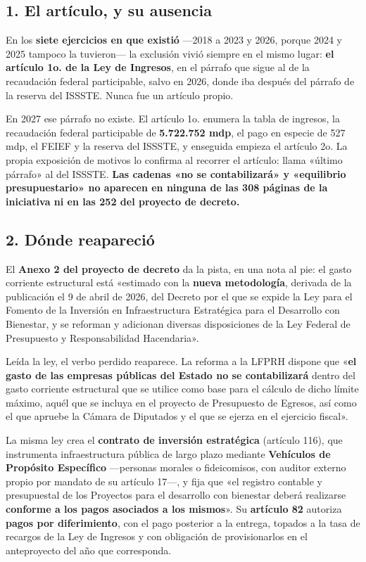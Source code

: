 \subsection*{1. El artículo, y su ausencia}

En los \textbf{siete ejercicios en que existió} ---2018 a 2023 y 2026, porque 2024 y 2025
tampoco la tuvieron--- la exclusión vivió siempre en el mismo lugar: \textbf{el artículo
1o. de la Ley de Ingresos}, en el párrafo que sigue al de la recaudación federal
participable, salvo en 2026, donde iba después del párrafo de la reserva del ISSSTE.
Nunca fue un artículo propio.

En 2027 ese párrafo no existe. El artículo 1o. enumera la tabla de ingresos, la recaudación
federal participable de \textbf{5.722.752 mdp}, el pago en especie de 527 mdp, el FEIEF y la
reserva del ISSSTE, y enseguida empieza el artículo 2o. La propia exposición de motivos lo
confirma al recorrer el artículo: llama «último párrafo» al del ISSSTE. \textbf{Las cadenas
«no se contabilizará» y «equilibrio presupuestario» no aparecen en ninguna de las 308
páginas de la iniciativa ni en las 252 del proyecto de decreto.}

\subsection*{2. Dónde reapareció}

El \textbf{Anexo 2 del proyecto de decreto} da la pista, en una nota al pie: el gasto
corriente estructural está «estimado con la \textbf{nueva metodología}, derivada de la
publicación el 9 de abril de 2026, del Decreto por el que se expide la Ley para el Fomento
de la Inversión en Infraestructura Estratégica para el Desarrollo con Bienestar, y se
reforman y adicionan diversas disposiciones de la Ley Federal de Presupuesto y
Responsabilidad Hacendaria».

Leída la ley, el verbo perdido reaparece. La reforma a la LFPRH dispone que «\textbf{el
gasto de las empresas públicas del Estado no se contabilizará} dentro del gasto corriente
estructural que se utilice como base para el cálculo de dicho límite máximo, aquél que se
incluya en el proyecto de Presupuesto de Egresos, así como el que apruebe la Cámara de
Diputados y el que se ejerza en el ejercicio fiscal».

La misma ley crea el \textbf{contrato de inversión estratégica} (artículo 116), que
instrumenta infraestructura pública de largo plazo mediante \textbf{Vehículos de Propósito
Específico} ---personas morales o fideicomisos, con auditor externo propio por mandato de su
artículo 17---, y fija que «el registro contable y presupuestal de los Proyectos para el
desarrollo con bienestar deberá realizarse \textbf{conforme a los pagos asociados a los
mismos}». Su \textbf{artículo 82} autoriza \textbf{pagos por diferimiento}, con el pago
posterior a la entrega, topados a la tasa de recargos de la Ley de Ingresos y con obligación
de provisionarlos en el anteproyecto del año que corresponda.


